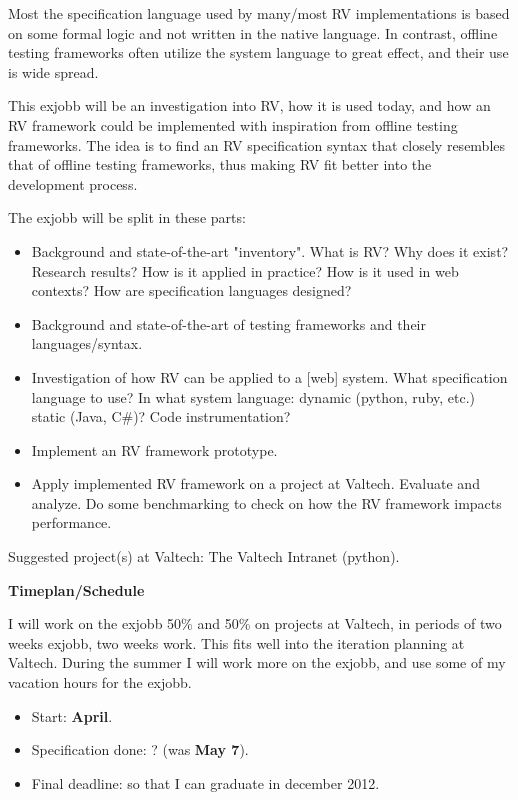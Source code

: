 \documentclass[a4paper,11pt]{kth-mag}
\begin{document}
Most the specification language used by many/most RV implementations is based on some formal logic and not written in the native language. In contrast, offline testing frameworks often utilize the system language to great effect, and their use is wide spread.

This exjobb will be an investigation into RV, how it is used today, and how an RV framework could be implemented with inspiration from offline testing frameworks. The idea is to find an RV specification syntax that closely resembles that of offline testing frameworks, thus making RV fit better into the development process.

The exjobb will be split in these parts: 

\begin{itemize}
	\item Background and state-of-the-art "inventory". What is RV? Why does it exist?  Research results? How is it applied in practice? How is it used in web contexts? How are specification languages designed?
	\item Background and state-of-the-art of testing frameworks and their languages/syntax.
	\item Investigation of how RV can be applied to a [web] system. What specification language to use? In what system language: dynamic (python, ruby, etc.) static (Java, C#)? Code instrumentation?
	\item Implement an RV framework prototype.
	\item Apply implemented RV framework on a project at Valtech. Evaluate and analyze. Do some benchmarking to check on how the RV framework impacts performance.
\end{itemize}

Suggested project(s) at Valtech: The Valtech Intranet (python).

\textbf{Timeplan/Schedule}

I will work on the exjobb 50\% and 50\% on projects at Valtech, in periods of two weeks exjobb, two weeks work. This fits well into the iteration planning at Valtech. During the summer I will work more on the exjobb, and use some of my vacation hours for the exjobb.

\begin{itemize}
	\item Start: \textbf{April}.
	\item Specification done: ? (was \textbf{May 7}).
	\item Final deadline: so that I can graduate in december 2012.
\end{itemize}
\end{document}
